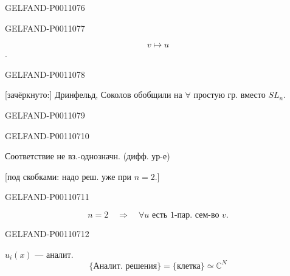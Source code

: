 \begin{GelfandAdjacentEvidence}{GELFAND-P001107}{6}

\end{GelfandAdjacentEvidence}
\begin{GelfandAdjacentEvidence}{GELFAND-P001107}{7}


\[
v\longmapsto u
\]
.
\end{GelfandAdjacentEvidence}
\begin{GelfandAdjacentEvidence}{GELFAND-P001107}{8}


[зачёркнуто:] Дринфельд, Соколов обобщили на $\forall$ простую гр. вместо $SL_n$.
\end{GelfandAdjacentEvidence}
\begin{GelfandAdjacentEvidence}{GELFAND-P001107}{9}

\end{GelfandAdjacentEvidence}
\begin{GelfandAdjacentEvidence}{GELFAND-P001107}{10}


Соответствие не вз.-однозначн. (дифф. ур-е)

[под скобками: надо реш. уже при $n=2$.]
\end{GelfandAdjacentEvidence}
\begin{GelfandAdjacentEvidence}{GELFAND-P001107}{11}

\[
n=2\quad\Rightarrow\quad\forall u\text{ есть 1-пар. сем-во }v.
\]
\end{GelfandAdjacentEvidence}
\begin{GelfandAdjacentEvidence}{GELFAND-P001107}{12}


$u_i(x)$ — аналит.
\[
\{\text{Аналит. решения}\}=\{\text{клетка}\}\simeq\mathbb C^N
\]
\end{GelfandAdjacentEvidence}
